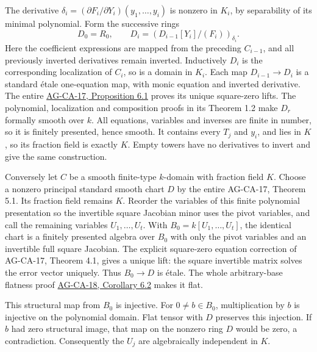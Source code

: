 \documentclass[11pt,a4paper,openany]{report}
\begin{document}
The derivative \(\delta_i=(\partial F_i/\partial Y_i)(y_1,\ldots,y_i)\) is nonzero in \(K_i\), by separability of its minimal polynomial. Form the successive rings \[D_0=R_0,\qquad
D_i=(D_{i-1}[Y_i]/(F_i))_{\delta_i}.\] Here the coefficient expressions are mapped from the preceding \(C_{i-1}\), and all previously inverted derivatives remain inverted. Inductively \(D_i\) is the corresponding localization of \(C_i\), so is a domain in \(K_i\). Each map \(D_{i-1}\to D_i\) is a standard étale one-equation map, with monic equation and inverted derivative. The entire \href{https://github.com/KokunoYumeto/open-math-courses/blob/d02d0a3669f42579db037cd44de1d113fdd770a1/docs/courses/AG-CA/src/formally-smooth-unramified-and-etale-ring-maps.md}{AG-CA-17, Proposition 6.1} proves its unique square-zero lifts. The polynomial, localization and composition proofs in its Theorem 1.2 make \(D_r\) formally smooth over \(k\). All equations, variables and inverses are finite in number, so it is finitely presented, hence smooth. It contains every \(T_j\) and \(y_i\), and lies in \(K\), so its fraction field is exactly \(K\). Empty towers have no derivatives to invert and give the same construction.

Conversely let \(C\) be a smooth finite-type \(k\)-domain with fraction field \(K\). Choose a nonzero principal standard smooth chart \(D\) by the entire AG-CA-17, Theorem 5.1. Its fraction field remains \(K\). Reorder the variables of this finite polynomial presentation so the invertible square Jacobian minor uses the pivot variables, and call the remaining variables \(U_1,\ldots,U_t\). With \(B_0=k[U_1,\ldots,U_t]\), the identical chart is a finitely presented algebra over \(B_0\) with only the pivot variables and an invertible full square Jacobian. The explicit square-zero equation correction of AG-CA-17, Theorem 4.1, gives a unique lift: the square invertible matrix solves the error vector uniquely. Thus \(B_0\to D\) is étale. The whole arbitrary-base flatness proof \href{https://github.com/KokunoYumeto/open-math-courses/blob/d02d0a3669f42579db037cd44de1d113fdd770a1/docs/courses/AG-CA/src/smooth-algebras-over-a-field-and-the-jacobian-criterion.md}{AG-CA-18, Corollary 6.2} makes it flat.

This structural map from \(B_0\) is injective. For \(0\ne b\in B_0\), multiplication by \(b\) is injective on the polynomial domain. Flat tensor with \(D\) preserves this injection. If \(b\) had zero structural image, that map on the nonzero ring \(D\) would be zero, a contradiction. Consequently the \(U_j\) are algebraically independent in \(K\).
\end{document}
